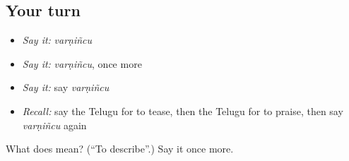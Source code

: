 \subsection*{Your turn}
\begin{itemize}
\raggedright
  \item \emph{Say it:} \emph{varṇiñcu}
  \item \emph{Say it:} \emph{varṇiñcu}, once more
  \item \emph{Say it:} say \emph{varṇiñcu}
  \item \emph{Recall:} say the Telugu for to tease, then the Telugu for to praise, then say \emph{varṇiñcu} again
\end{itemize}

\begin{tcolorbox}[breakable,colback=teal!4,colframe=teal!35!black,title={Before you move on}]
What does  mean? (\textquotedblleft{}To describe\textquotedblright{}.) Say it once more.
\end{tcolorbox}
